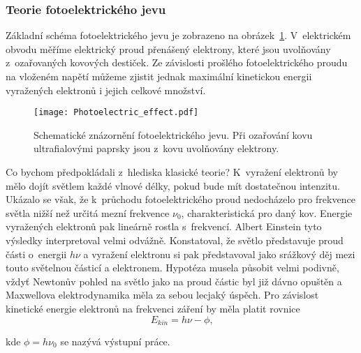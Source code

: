 \subsubsection{Teorie fotoelektrického jevu}
Základní schéma fotoelektrického jevu je zobrazeno na obrázek~\ref{obr:Fotoefekt}. V~elektrickém obvodu měříme elektrický proud přenášený elektrony, které jsou uvolňovány z~ozařovaných kovových destiček. Ze závislosti prošlého fotoelektrického proudu na vloženém napětí můžeme zjistit jednak maximální kinetickou energii vyražených elektronů i jejich celkové množství.

\begin{figure} [ht]
\centering
\texttt{[image: Photoelectric\_effect.pdf]}
\caption[Fotoelektrický jev]{Schematické znázornění fotoelektrického jevu. Při ozařování kovu ultrafialovými paprsky jsou z~kovu uvolňovány elektrony.}
\label{obr:Fotoefekt}
\end{figure}

Co bychom předpokládali z~hlediska klasické teorie? K~vyražení elektronů by mělo dojít světlem každé vlnové délky, pokud bude mít dostatečnou intenzitu. Ukázalo se však, že k~průchodu fotoelektrického proud nedocházelo pro frekvence světla nižší než určitá mezní frekvence $\nu_0$, charakteristická pro daný kov. Energie vyražených elektronů pak lineárně rostla s~frekvencí.
Albert Einstein tyto výsledky interpretoval velmi odvážně. Konstatoval, že světlo představuje proud části o~energii $h\nu$ a vyražení elektronu si pak představoval jako srážkový děj mezi touto světelnou částicí a elektronem. Hypotéza musela působit velmi podivně, vždyť Newtonův pohled na světlo jako na proud částic byl již dávno opuštěn a Maxwellova elektrodynamika měla za sebou lecjaký úspěch. Pro závislost kinetické energie elektronů na frekvenci záření by měla platit rovnice
\begin{equation}
E_{kin} = h\nu - \phi\mbox{,}
\label{rov:Fotojev1}
\end{equation}

\noindent kde $\phi = h\nu_0$ se nazývá výstupní práce. 

